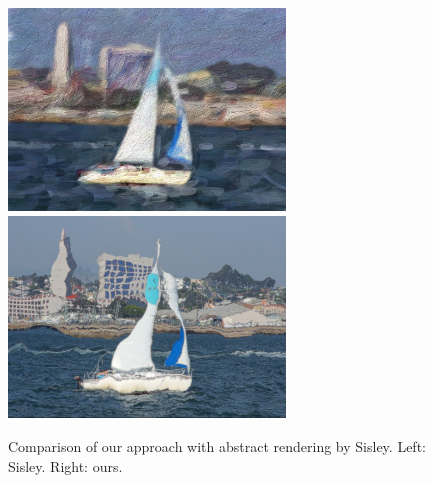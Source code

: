 \begin{figure}[htbp] \centering
\includegraphics[width=2.9in]{images/sisley-actual.jpg}
\includegraphics[width=2.9in]{images/sisley-compare-use.jpg}
\caption{Comparison of our approach with abstract rendering by Sisley. Left: Sisley. Right: ours.}
\label{fig:sisleycompare} 
\end{figure}

